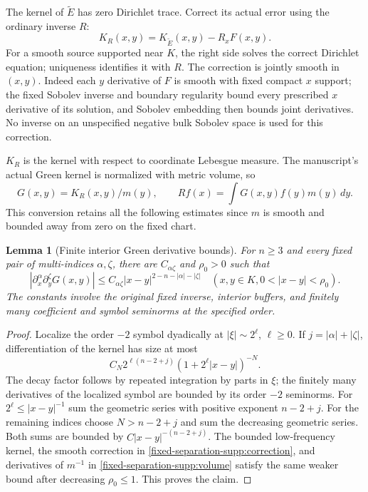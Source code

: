 \documentclass[11pt]{article}
\newtheorem{lemma}[theorem]{Lemma}
\theoremstyle{definition}
\theoremstyle{remark}
\numberwithin{equation}{section}
\begin{document}
The kernel of $\widetilde E$ has zero Dirichlet trace. Correct its actual
error using the ordinary inverse $R$:
\begin{equation}\label{fixed-separation-supp:correction}
 K_R(x,y)=K_{\widetilde E}(x,y)-R_xF(x,y).
\end{equation}
For a smooth source supported near $K$, the right side solves the correct
Dirichlet equation; uniqueness identifies it with $R$. The correction is
jointly smooth in $(x,y)$. Indeed each $y$ derivative of $F$ is smooth
with fixed compact $x$ support; the fixed Sobolev inverse and boundary
regularity bound every prescribed $x$ derivative of its solution, and
Sobolev embedding then bounds joint derivatives. No inverse on an
unspecified negative bulk Sobolev space is used for this correction.

$K_R$ is the kernel with respect to coordinate Lebesgue measure. The
manuscript's actual Green kernel is normalized with metric volume, so
\begin{equation}\label{fixed-separation-supp:volume}
 G(x,y)=K_R(x,y)/m(y),\qquad
 Rf(x)=\int G(x,y)f(y)m(y)\,dy.
\end{equation}
This conversion retains all the following estimates since $m$ is smooth
and bounded away from zero on the fixed chart.

\begin{lemma}[Finite interior Green derivative bounds]
\label{fixed-separation-supp:kernel}
For $n\ge3$ and every fixed pair of multi-indices $\alpha,\zeta$, there
are $C_{\alpha\zeta}$ and $\rho_0>0$ such that
\begin{equation}\label{fixed-separation-supp:kernel-bound}
 |\partial_x^\alpha\partial_y^\zeta G(x,y)|
 \le C_{\alpha\zeta}|x-y|^{2-n-|\alpha|-|\zeta|}
 \quad(x,y\in K, 0<|x-y|<\rho_0).
\end{equation}
The constants involve the original fixed inverse, interior buffers, and
finitely many coefficient and symbol seminorms at the specified order.
\end{lemma}
\begin{proof}
Localize the order $-2$ symbol dyadically at $|\xi|\sim2^\ell$,
$\ell\ge0$. If $j=|\alpha|+|\zeta|$, differentiation of the kernel
has size at most
\[
 C_N2^{\ell(n-2+j)}(1+2^\ell|x-y|)^{-N}.
\]
The decay factor follows by repeated integration by parts in $\xi$;
the finitely many derivatives of the localized symbol are bounded by its
order $-2$ seminorms. For $2^\ell\le|x-y|^{-1}$ sum the geometric
series with positive exponent $n-2+j$. For the remaining indices choose
$N>n-2+j$ and sum the decreasing geometric series. Both sums are bounded
by $C|x-y|^{-(n-2+j)}$. The bounded low-frequency kernel, the smooth
correction in \eqref{fixed-separation-supp:correction}, and derivatives
of $m^{-1}$ in \eqref{fixed-separation-supp:volume} satisfy the same
weaker bound after decreasing $\rho_0\le1$. This proves the claim.
\end{proof}
\end{document}
